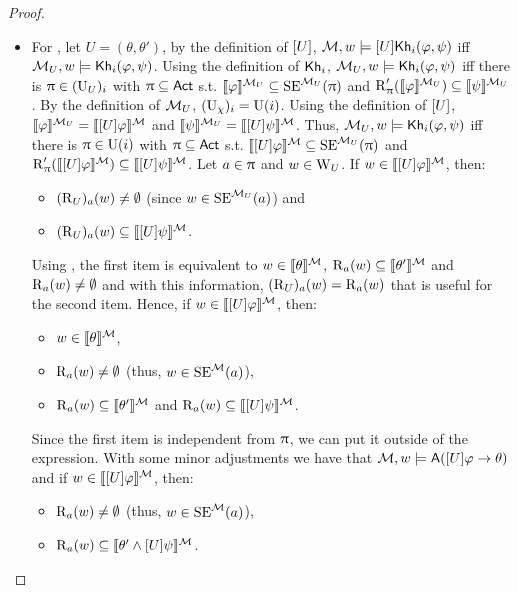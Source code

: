 \begin{proof}
\begin{itemize}
	\item For , let $U = (\theta,\theta')$, by the definition of $[U]$, $\mathcal{M},w \models [U]{\sf Kh}_i(\varphi,\psi)$ iff $\mathcal{M}_{{U}},w \models {\sf Kh}_i(\varphi,\psi)$.
	Using the definition of ${\sf Kh}_i$, $\mathcal{M}_{{U}},w \models {\sf Kh}_i(\varphi,\psi)$ iff there is $\uppi \in (\operatorname{U}_{{U}})_i$ with $\uppi \subseteq {\rm \sf Act}$ s.t. $\llbracket \varphi \rrbracket^{\mathcal{M}_{{U}}} \subseteq \operatorname{SE}^{\mathcal{M}_{{U}}}(\uppi)$ and $\operatorname{R}'_\uppi(\llbracket \varphi \rrbracket^{\mathcal{M}_{{U}}}) \subseteq \llbracket \psi \rrbracket^{\mathcal{M}_{{U}}}$.
	By the definition of $\mathcal{M}_{{U}}$, $(\operatorname{U}_{{\chi}})_i=\operatorname{U}(i)$. Using the definition of $[U]$, $\llbracket \varphi \rrbracket^{\mathcal{M}_{{U}}} = \llbracket [U]\varphi \rrbracket^{\mathcal{M}}$ and $\llbracket \psi \rrbracket^{\mathcal{M}_{{U}}} = \llbracket [U]\psi \rrbracket^{\mathcal{M}}$.
	Thus, $\mathcal{M}_{{U}},w \models {\sf Kh}_i(\varphi,\psi)$ iff there is $\uppi \in \operatorname{U}(i)$ with $\uppi \subseteq {\rm \sf Act}$ s.t. $\llbracket [U]\varphi \rrbracket^{\mathcal{M}} \subseteq \operatorname{SE}^{\mathcal{M}_{{U}}}(\uppi)$ and $\operatorname{R}'_\uppi(\llbracket [U]\varphi \rrbracket^{\mathcal{M}}) \subseteq \llbracket [U]\psi \rrbracket^{\mathcal{M}}$.
	Let $a \in \uppi$ and $w \in \operatorname{W}_{{U}}$. If $w \in \llbracket [U]\varphi \rrbracket^{\mathcal{M}}$, then:
	\begin{itemize}
	\item $(\operatorname{R}_{{U}})_a(w) \neq \emptyset$ (since $w \in \operatorname{SE}^{\mathcal{M}_{{U}}}(a)$) and
	\item $(\operatorname{R}_{{U}})_a(w) \subseteq \llbracket [U]\psi \rrbracket^{\mathcal{M}}$.
	\end{itemize}
	Using , the first item is equivalent to $w \in \llbracket \theta \rrbracket^{\mathcal{M}}$, $\operatorname{R}_a(w) \subseteq \llbracket \theta' \rrbracket^{\mathcal{M}}$ and $\operatorname{R}_a(w) \neq \emptyset$ and with this information, $(\operatorname{R}_{{U}})_a(w) = \operatorname{R}_a(w)$ that is useful for the second item.
	Hence, if $w \in \llbracket [U]\varphi \rrbracket^{\mathcal{M}}$, then:
	\begin{itemize}
	\item $w \in \llbracket \theta \rrbracket^{\mathcal{M}}$,
	\item $\operatorname{R}_a(w) \neq \emptyset$ (thus, $w \in \operatorname{SE}^{\mathcal{M}}(a)$),
	\item $\operatorname{R}_a(w) \subseteq \llbracket \theta' \rrbracket^{\mathcal{M}}$ and $\operatorname{R}_a(w) \subseteq \llbracket [U]\psi \rrbracket^{\mathcal{M}}$.
	\end{itemize}
	Since the first item is independent from $\uppi$, we can put it outside of the expression.
	With some minor adjustments we have that $\mathcal{M},w \models {\sf A}([U]\varphi \rightarrow \theta)$ and if $w \in \llbracket [U]\varphi \rrbracket^{\mathcal{M}}$, then:
	\begin{itemize}
	\item $\operatorname{R}_a(w) \neq \emptyset$ (thus, $w \in \operatorname{SE}^{\mathcal{M}}(a)$),
	\item $\operatorname{R}_a(w) \subseteq \llbracket \theta' \wedge [U]\psi \rrbracket^{\mathcal{M}}$.
	\end{itemize}
	

\end{itemize}
\end{proof}
